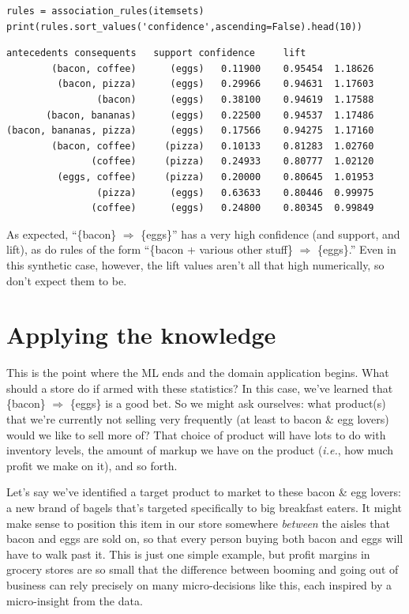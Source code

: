 \begin{Verbatim}[fontsize=\footnotesize,samepage=true,frame=single,framesep=3mm]
rules = association_rules(itemsets)
print(rules.sort_values('confidence',ascending=False).head(10))
\end{Verbatim}
\vspace{-.2in}

\begin{Verbatim}[fontsize=\footnotesize,samepage=true,frame=leftline,framesep=2mm,framerule=1mm]
            antecedents consequents   support confidence     lift
        (bacon, coffee)      (eggs)   0.11900    0.95454  1.18626
         (bacon, pizza)      (eggs)   0.29966    0.94631  1.17603
                (bacon)      (eggs)   0.38100    0.94619  1.17588
       (bacon, bananas)      (eggs)   0.22500    0.94537  1.17486
(bacon, bananas, pizza)      (eggs)   0.17566    0.94275  1.17160
        (bacon, coffee)     (pizza)   0.10133    0.81283  1.02760
               (coffee)     (pizza)   0.24933    0.80777  1.02120
         (eggs, coffee)     (pizza)   0.20000    0.80645  1.01953
                (pizza)      (eggs)   0.63633    0.80446  0.99975
               (coffee)      (eggs)   0.24800    0.80345  0.99849
\end{Verbatim}

As expected, ``\{bacon\} $\Rightarrow$ \{eggs\}'' has a very high confidence
(and support, and lift), as do rules of the form ``\{bacon + various other
stuff\} $\Rightarrow$ \{eggs\}.'' Even in this synthetic case, however, the
lift values aren't all that high numerically, so don't expect them to be.

\section{Applying the knowledge}


This is the point where the ML ends and the domain application begins. What
should a store do if armed with these statistics? In this case, we've learned
that \{bacon\} $\Rightarrow$ \{eggs\} is a good bet. So we might ask ourselves:
what product(s) that we're currently not selling very frequently (at least to
bacon \& egg lovers) would we like to sell more of? That choice of product will
have lots to do with inventory levels, the amount of markup we have on the
product (\textit{i.e.}, how much profit we make on it), and so forth.


Let's say we've identified a target product to market to these bacon \& egg
lovers: a new brand of bagels that's targeted specifically to big breakfast
eaters. It might make sense to position this item in our store somewhere
\textit{between} the aisles that bacon and eggs are sold on, so that every
person buying both bacon and eggs will have to walk past it. This is just one
simple example, but profit margins in grocery stores are so small that the
difference between booming and going out of business can rely precisely on many
micro-decisions like this, each inspired by a micro-insight from the data.